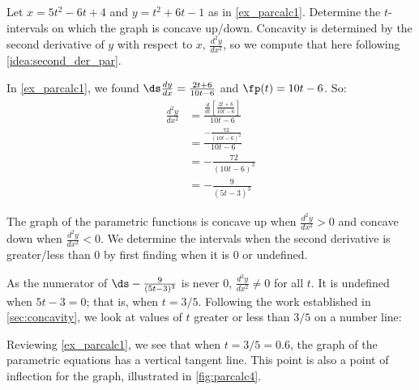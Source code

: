 \begin{example}\label{ex_parcalc4}
Let $x=5t^2-6t+4$ and $y=t^2+6t-1$ as in \autoref{ex_parcalc1}. Determine the $t$-intervals on which the graph is concave up/down.
\solution
Concavity is determined by the second derivative of $y$ with respect to $x$, $\frac{d^2y}{dx^2}$, so we compute that here following \autoref{idea:second_der_par}.

In \autoref{ex_parcalc1}, we found $\ds\frac{dy}{dx} = \frac{2t+6}{10t-6}$ and $\fp(t) = 10t-6$. So:
\begin{align*}
	\frac{d^2y}{dx^2}
	&= \frac{\frac{d}{dt}\left[\frac{2t+6}{10t-6}\right]}{10t-6} \\
	&= \frac{-\frac{72}{(10t-6)^2}}{10t-6}\\
	&= -\frac{72}{(10t-6)^3} \\&= -\frac{9}{(5t-3)^3}
\end{align*}


The graph of the parametric functions is concave up when $\frac{d^2y}{dx^2} > 0$ and concave down when $\frac{d^2y}{dx^2} <0$. We determine the intervals when the second derivative is greater/less than 0 by first finding when it is 0 or undefined.

As the numerator of $\ds -\frac{9}{(5t-3)^3}$ is never 0, $\frac{d^2y}{dx^2} \neq 0$ for all $t$. It is undefined when $5t-3=0$; that is, when $t= 3/5$. Following the work established in \autoref{sec:concavity}, we look at values of $t$ greater or less than $3/5$ on a number line:
\begin{center}
\end{center}

Reviewing \autoref{ex_parcalc1}, we see that when $t=3/5=0.6$, the graph of the parametric equations has a vertical tangent line. This point is also a point of inflection for the graph, illustrated in \autoref{fig:parcalc4}.
\end{example}

